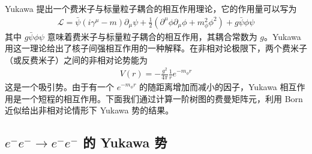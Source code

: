 
Yukawa 提出一个费米子与标量粒子耦合的相互作用理论，它的作用量可以写为
\begin{equation}
\begin{aligned}
\mathcal{L}=\bar\psi (i\gamma^\mu-m) \partial_\mu \psi+
\frac{1}{2}(\partial^\mu \phi \partial_\mu \phi + m_\phi^2 \phi^2) + g\bar\psi\phi\psi
\end{aligned}
\end{equation}
其中 $g\bar\psi \phi\psi$ 意味着费米子与标量粒子耦合的相互作用，其耦合常数为 $g$。Yukawa 用这一理论给出了核子间强相互作用的一种解释。在非相对论极限下，两个费米子（或反费米子）之间的非相对论势能为
\begin{equation}
\begin{aligned}
V(r)=-\frac{g^2}{4\pi} \frac{1}{r} e^{- m_\phi r}
\end{aligned}
\end{equation}
这是一个吸引势。由于有一个 $e^{-m_\phi r}$ 的随距离增加而减小的因子，Yukawa 相互作用是一个短程的相互作用。下面我们通过计算一阶树图的费曼矩阵元，利用 Born 近似给出非相对论情形下 Yukawa 势的结果。

\subsection{$e^-e^-\rightarrow e^-e^-$ 的 Yukawa 势}

